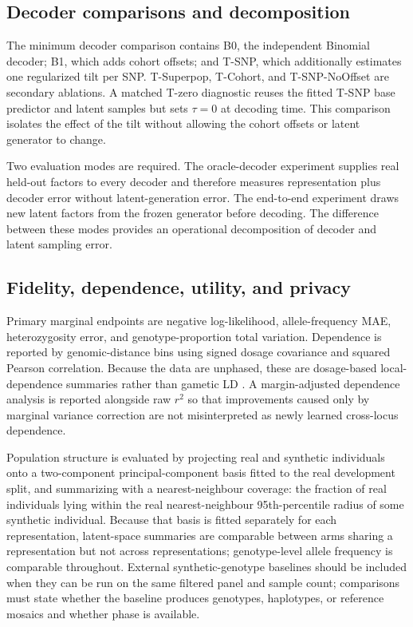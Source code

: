 \documentclass[11pt,a4paper]{article}
\begin{document}
\subsection{Decoder comparisons and decomposition}
\label{sec:comparisons}

The minimum decoder comparison contains B0, the independent Binomial decoder;
B1, which adds cohort offsets; and T-SNP, which additionally estimates one
regularized tilt per SNP. T-Superpop, T-Cohort, and T-SNP-NoOffset are secondary
ablations. A matched T-zero diagnostic reuses the fitted T-SNP base predictor
and latent samples but sets $\tau=0$ at decoding time. This comparison isolates
the effect of the tilt without allowing the cohort offsets or latent generator
to change.

Two evaluation modes are required. The oracle-decoder experiment supplies real
held-out factors to every decoder and therefore measures representation plus
decoder error without latent-generation error. The end-to-end experiment draws
new latent factors from the frozen generator before decoding. The difference
between these modes provides an operational decomposition of decoder and latent
sampling error.

\subsection{Fidelity, dependence, utility, and privacy}
\label{sec:metrics}

Primary marginal endpoints are negative log-likelihood, allele-frequency MAE,
heterozygosity error, and genotype-proportion total variation. Dependence is
reported by genomic-distance bins using signed dosage covariance and squared
Pearson correlation. Because the data are unphased, these are dosage-based
local-dependence summaries rather than gametic LD \citep{Rogers2009}. A
margin-adjusted dependence analysis is reported alongside raw $r^2$ so that
improvements caused only by marginal variance correction are not misinterpreted
as newly learned cross-locus dependence.

Population structure is evaluated by projecting real and synthetic individuals
onto a two-component principal-component basis fitted to the real development
split, and summarizing with a nearest-neighbour coverage: the fraction of real
individuals lying within the real nearest-neighbour 95th-percentile radius of
some synthetic individual. Because that basis is fitted separately for each
representation, latent-space summaries are comparable between arms sharing a
representation but not across representations; genotype-level allele frequency
is comparable throughout. External synthetic-genotype baselines should be
included when they can be run on the same filtered panel and sample count;
comparisons must state whether the baseline produces genotypes, haplotypes, or
reference mosaics and whether phase is available.
\end{document}

